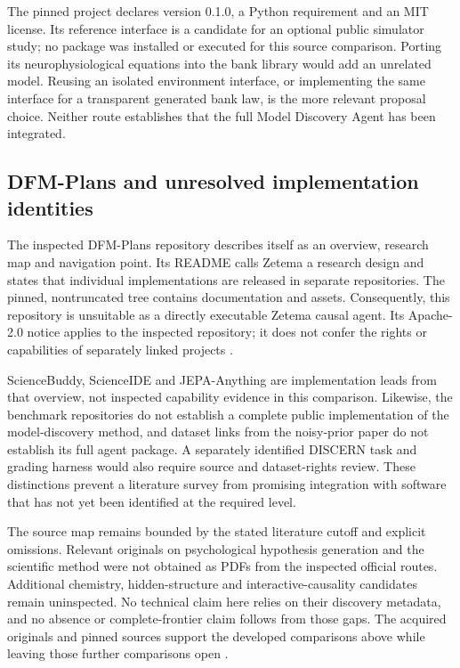 The pinned project declares version 0.1.0, a Python requirement and an MIT
license. Its reference interface is a candidate for an optional public
simulator study; no package was installed or executed for this source
comparison. Porting its neurophysiological equations into the bank library
would add an unrelated model. Reusing an isolated environment interface, or
implementing the same interface for a transparent generated bank law, is the
more relevant proposal choice. Neither route establishes that the full
Model Discovery Agent has been integrated.

\subsection{DFM-Plans and unresolved implementation identities}

The inspected DFM-Plans repository describes itself as an overview, research
map and navigation point. Its README calls Zetema a research design and
states that individual implementations are released in separate repositories.
The pinned, nontruncated tree contains documentation and assets. Consequently,
this repository is unsuitable as a directly executable Zetema causal agent.
Its Apache-2.0 notice applies to the inspected repository; it does not confer
the rights or capabilities of separately linked projects
\cite{exec13_active_dfmplans}.

ScienceBuddy, ScienceIDE and JEPA-Anything are implementation leads from that
overview, not inspected capability evidence in this comparison. Likewise,
the benchmark repositories do not establish a complete public implementation
of the model-discovery method, and dataset links from the noisy-prior paper
do not establish its full agent package. A separately identified DISCERN
task and grading harness would also require source and dataset-rights review.
These distinctions prevent a literature survey from promising integration
with software that has not yet been identified at the required level.

The source map remains bounded by the stated literature cutoff and explicit
omissions. Relevant originals on psychological hypothesis generation and the
scientific method were not obtained as PDFs from the inspected official
routes. Additional chemistry, hidden-structure and interactive-causality
candidates remain uninspected. No technical claim here relies on their
discovery metadata, and no absence or complete-frontier claim follows from
those gaps. The acquired originals and pinned sources support the developed
comparisons above while leaving those further comparisons open
\cite{exec13_active_scope}.

